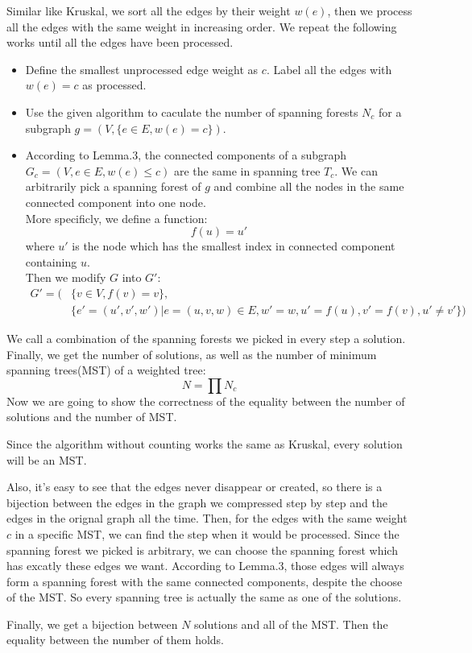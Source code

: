 Similar like Kruskal, we sort all the edges by their weight $w(e)$, then we process all the edges with the same weight in increasing order. We repeat the following works until all the edges have been processed.
	\begin{itemize}
		\item Define the smallest unprocessed edge weight as $c$. Label all the edges with $w(e)=c$ as processed.
		\item Use the given algorithm to caculate the number of spanning forests $N_c$ for a subgraph $g=(V,\{e\in E,w(e)=c\})$.
		\item According to Lemma.3, the connected components of a subgraph $G_c=(V,{e\in E,w(e)\leq c})$ are the same in spanning tree $T_c$. We can arbitrarily pick a spanning forest of $g$ and combine all the nodes in the same connected component into one node.\\
		More specificly, we define a function: $$f(u)=u'$$ where $u'$ is the node which has the smallest index in connected component containing $u$.\\ Then we modify $G$ into $G'$:
		\begin{align*}
		G'=(&\{v\in V,f(v)=v\},\\
		&\{e'=(u',v',w')|e=(u,v,w)\in E,w'=w,u'=f(u),v'=f(v),u'\neq v'\})
		\end{align*}
	\end{itemize}
	We call a combination of the spanning forests we picked in every step a solution. Finally, we get the number of solutions, as well as the number of minimum spanning trees(MST) of a weighted tree:
	$$N=\prod N_c$$
	Now we are going to show the correctness of the equality between the number of solutions and the number of MST.\par
	Since the algorithm without counting works the same as Kruskal, every solution will be an MST.\par
	Also, it's easy to see that the edges never disappear or created, so there is a bijection between the edges in the graph we compressed step by step and the edges in the orignal graph all the time. Then, for the edges with the same weight $c$ in a specific MST, we can find the step when it would be processed. Since the spanning forest we picked is arbitrary, we can choose the spanning forest which has excatly these edges we want. According to Lemma.3, those edges will always form a spanning forest with the same connected components, despite the choose of the MST. So every spanning tree is actually the same as one of the solutions.\par
	Finally, we get a bijection between $N$ solutions and all of the MST. Then the equality between the number of them holds.
